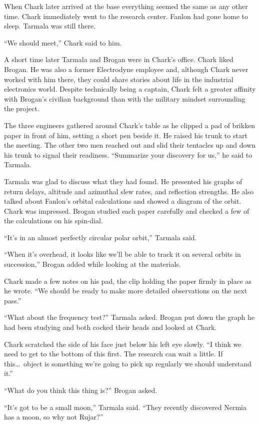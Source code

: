 When Chark later arrived at the base everything seemed the same as any other time. Chark
immediately went to the research center. Fanlon had gone home to sleep. Tarmala was still there.

``We should meet,'' Chark said to him.

A short time later Tarmala and Brogan were in Chark's office. Chark liked Brogan. He was also a
former Electrodyne employee and, although Chark never worked with him there, they could share
stories about life in the industrial electronics world. Despite technically being a captain,
Chark felt a greater affinity with Brogan's civilian background than with the military mindset
surrounding the project.

The three engineers gathered around Chark's table as he clipped a pad of brikken paper in front
of him, setting a short pen beside it. He raised his trunk to start the meeting. The other two
men reached out and slid their tentacles up and down his trunk to signal their readiness.
``Summarize your discovery for us,'' he said to Tarmala.

Tarmala was glad to discuss what they had found. He presented his graphs of return delays,
altitude and azimuthal slew rates, and reflection strengths. He also talked about Fanlon's
orbital calculations and showed a diagram of the orbit. Chark was impressed. Brogan studied each
paper carefully and checked a few of the calculations on his spin-dial.

``It's in an almost perfectly circular polar orbit,'' Tarmala said.

``When it's overhead, it looks like we'll be able to track it on several orbits in succession,''
Brogan added while looking at the materials.

Chark made a few notes on his pad, the clip holding the paper firmly in place as he wrote. ``We
should be ready to make more detailed observations on the next pass.''

``What about the frequency test?'' Tarmala asked. Brogan put down the graph he had been studying
and both cocked their heads and looked at Chark.

Chark scratched the side of his face just below his left eye slowly. ``I think we need to get to
the bottom of this first. The research can wait a little. If this\ldots\ object is something
we're going to pick up regularly we should understand it.''

``What do you think this thing is?'' Brogan asked.

``It's got to be a small moon,'' Tarmala said. ``They recently discovered Nermia has a moon, so
why not Rujar?''

